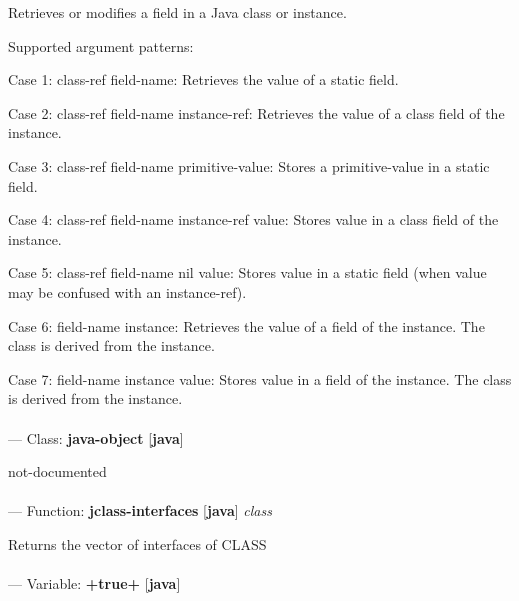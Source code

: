\begin{adjustwidth}{5em}{5em}
Retrieves or modifies a field in a Java class or instance.

Supported argument patterns:

   Case 1: class-ref  field-name:
      Retrieves the value of a static field.

   Case 2: class-ref  field-name  instance-ref:
      Retrieves the value of a class field of the instance.

   Case 3: class-ref  field-name  primitive-value:
      Stores a primitive-value in a static field.

   Case 4: class-ref  field-name  instance-ref  value:
      Stores value in a class field of the instance.

   Case 5: class-ref  field-name  nil  value:
      Stores value in a static field (when value may be
      confused with an instance-ref).

   Case 6: field-name  instance:
      Retrieves the value of a field of the instance. The
      class is derived from the instance.

   Case 7: field-name  instance  value:
      Stores value in a field of the instance. The class is
      derived from the instance.


\end{adjustwidth}

\paragraph{}
\label{JAVA:JAVA-OBJECT}
--- Class: \textbf{java-object} [\textbf{java}] \textit{}

\begin{adjustwidth}{5em}{5em}
not-documented
\end{adjustwidth}

\paragraph{}
\label{JAVA:JCLASS-INTERFACES}
--- Function: \textbf{jclass-interfaces} [\textbf{java}] \textit{class}

\begin{adjustwidth}{5em}{5em}
Returns the vector of interfaces of CLASS
\end{adjustwidth}

\paragraph{}
\label{JAVA:+TRUE+}
--- Variable: \textbf{+true+} [\textbf{java}] \textit{}

